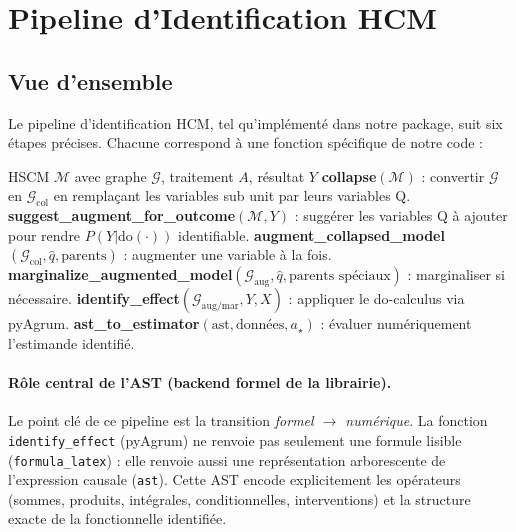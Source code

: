 \documentclass[11pt,a4paper]{article}
\newcommand{\rmdo}{\mathrm{do}}
\newcommand{\col}{\mathrm{col}}
\newcommand{\aug}{\mathrm{aug}}
\newcommand{\mar}{\mathrm{mar}}
\newcommand{\Mc}{\mathcal{M}}
\begin{document}
\section{Pipeline d'Identification HCM}
\label{sec:pipeline}

\subsection{Vue d'ensemble}

Le pipeline d'identification HCM, tel qu'implémenté dans notre package, suit six étapes précises.
Chacune correspond à une fonction spécifique de notre code :

\begin{algorithm}[h!]
\caption{Pipeline d'identification HCM}
\label{alg:pipeline}
\begin{algorithmic}[1]
\Require HSCM $\Mc$ avec graphe $\mathcal{G}$, traitement $A$, résultat $Y$
\State \textbf{collapse}$(\Mc)$ : convertir $\mathcal{G}$ en $\mathcal{G}_\col$ en remplaçant les variables sub unit par leurs variables Q.
\State \textbf{suggest\_augment\_for\_outcome}$(\Mc, Y)$ : suggérer les variables Q à ajouter pour rendre $P(Y|\rmdo(\cdot))$ identifiable.
\State \textbf{augment\_collapsed\_model}$(\mathcal{G}_\col, \hat{q}, \text{parents})$ : augmenter une variable à la fois.
\State \textbf{marginalize\_augmented\_model}$(\mathcal{G}_\aug, \hat{q}, \text{parents spéciaux})$ : marginaliser si nécessaire.
\State \textbf{identify\_effect}$(\mathcal{G}_{\aug/\mar}, Y, X)$ : appliquer le do-calculus via pyAgrum.
\State \textbf{ast\_to\_estimator}$(\text{ast}, \text{données}, a_\star)$ : évaluer numériquement l'estimande identifié.
\end{algorithmic}
\end{algorithm}

\paragraph{Rôle central de l'AST (backend formel de la librairie).}
Le point clé de ce pipeline est la transition \emph{formel $\rightarrow$ numérique}. La fonction \texttt{identify\_effect} (pyAgrum) ne renvoie pas seulement une formule lisible (\texttt{formula\_latex}) : elle renvoie aussi une représentation arborescente de l'expression causale (\texttt{ast}). Cette AST encode explicitement les opérateurs (sommes, produits, intégrales, conditionnelles, interventions) et la structure exacte de la fonctionnelle identifiée.
\end{document}
